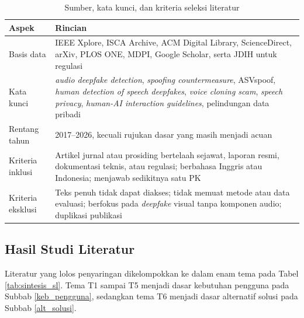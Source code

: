 \begin{table}[t]
  \centering
  \small
  \caption{Sumber, kata kunci, dan kriteria seleksi literatur}
  \label{tab:kriteria_sl}
  \renewcommand{\arraystretch}{1.25}
  \begin{tabularx}{\textwidth}{| l | X |}
    \hline
    \textbf{Aspek} & \textbf{Rincian} \\
    \hline
    Basis data & IEEE Xplore, ISCA Archive, ACM Digital Library, ScienceDirect, arXiv, PLOS ONE, MDPI, Google Scholar, serta JDIH untuk regulasi \\
    \hline
    Kata kunci & \textit{audio deepfake detection}, \textit{spoofing countermeasure}, ASVspoof, \textit{human detection of speech deepfakes}, \textit{voice cloning scam}, \textit{speech privacy}, \textit{human-AI interaction guidelines}, pelindungan data pribadi \\
    \hline
    Rentang tahun & 2017--2026, kecuali rujukan dasar yang masih menjadi acuan \\
    \hline
    Kriteria inklusi & Artikel jurnal atau prosiding bertelaah sejawat, laporan resmi, dokumentasi teknis, atau regulasi; berbahasa Inggris atau Indonesia; menjawab sedikitnya satu PK \\
    \hline
    Kriteria eksklusi & Teks penuh tidak dapat diakses; tidak memuat metode atau data evaluasi; berfokus pada \textit{deepfake} visual tanpa komponen audio; duplikasi publikasi \\
    \hline
  \end{tabularx}
\end{table}

\subsection{Hasil Studi Literatur}
\label{hasil_sl}

Literatur yang lolos penyaringan dikelompokkan ke dalam enam tema pada Tabel \ref{tab:sintesis_sl}. Tema T1 sampai T5 menjadi dasar kebutuhan pengguna pada Subbab \ref{keb_pengguna}, sedangkan tema T6 menjadi dasar alternatif solusi pada Subbab \ref{alt_solusi}.


